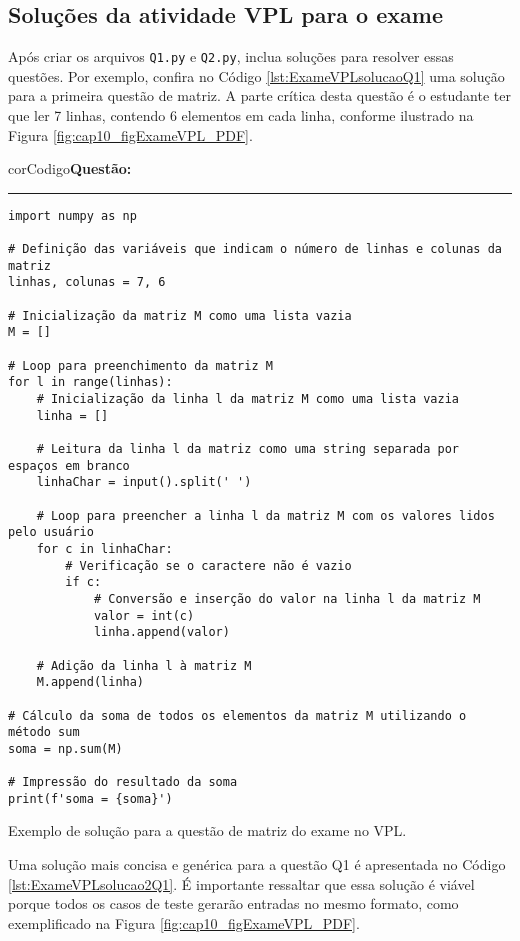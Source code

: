 \subsection{Soluções da atividade VPL para o exame}

Após criar os arquivos \verb|Q1.py| e \verb|Q2.py|, inclua soluções para resolver essas questões. Por exemplo, confira no Código \ref{lst:ExameVPLsolucaoQ1} uma solução para a primeira questão de matriz. A parte crítica desta questão é o estudante ter que ler 7 linhas, contendo 6 elementos em cada linha, conforme ilustrado na Figura \ref{fig:cap10_figExameVPL_PDF}. 


\begin{listing}[!ht]
\begin{myboxCode}{corCodigo}{\textbf{Questão: } }\vspace{3mm}
\hrule
\begin{verbatim}
import numpy as np

# Definição das variáveis que indicam o número de linhas e colunas da matriz
linhas, colunas = 7, 6

# Inicialização da matriz M como uma lista vazia
M = []

# Loop para preenchimento da matriz M
for l in range(linhas):
    # Inicialização da linha l da matriz M como uma lista vazia
    linha = []
    
    # Leitura da linha l da matriz como uma string separada por espaços em branco
    linhaChar = input().split(' ')
    
    # Loop para preencher a linha l da matriz M com os valores lidos pelo usuário
    for c in linhaChar:
        # Verificação se o caractere não é vazio
        if c:
            # Conversão e inserção do valor na linha l da matriz M
            valor = int(c)
            linha.append(valor)
    
    # Adição da linha l à matriz M
    M.append(linha)

# Cálculo da soma de todos os elementos da matriz M utilizando o método sum 
soma = np.sum(M)

# Impressão do resultado da soma
print(f'soma = {soma}')
\end{verbatim}
\end{myboxCode}
\caption{Exemplo de solução para a questão de matriz do exame no VPL.}
\label{lst:ExameVPLsolucaoQ1}
\end{listing}

Uma solução mais concisa e genérica para a questão Q1 é apresentada no Código \ref{lst:ExameVPLsolucao2Q1}. É importante ressaltar que essa solução é viável porque todos os casos de teste gerarão entradas no mesmo formato, como exemplificado na Figura \ref{fig:cap10_figExameVPL_PDF}.

